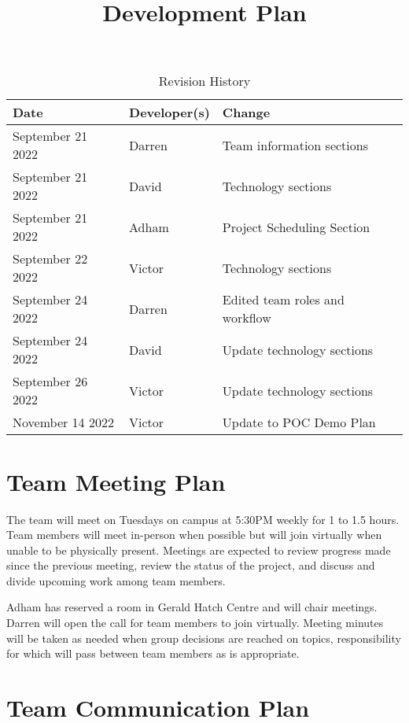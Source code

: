 \documentclass{article}
\title{Development Plan\\\progname}
\author{\authname}
\date{}
\begin{document}
\maketitle

\begin{table}[hp]
\caption{Revision History} \label{TblRevisionHistory}
\begin{tabularx}{\textwidth}{llX}
\toprule
\textbf{Date} & \textbf{Developer(s)} & \textbf{Change}\\
\midrule
September 21 2022 & Darren & Team information sections\\
September 21 2022 & David & Technology sections\\
September 21 2022 & Adham & Project Scheduling Section\\
September 22 2022 & Victor & Technology sections\\
September 24 2022 & Darren & Edited team roles and workflow\\
September 24 2022 & David & Update technology sections\\
September 26 2022 & Victor & Update technology sections\\
November 14 2022 & Victor & Update to POC Demo Plan\\
\bottomrule
\end{tabularx}
\end{table}



\section{Team Meeting Plan}

The team will meet on Tuesdays on campus at 5:30PM weekly for 1 to 1.5 hours. Team members will meet in-person when possible but will join virtually when unable to be physically present. Meetings are expected to review progress made since the previous meeting, review the status of the project, and discuss and divide upcoming work among team members.

Adham has reserved a room in Gerald Hatch Centre and will chair meetings. Darren will open the call for team members to join virtually. Meeting minutes will be taken as needed when group decisions are reached on topics, responsibility for which will pass between team members as is appropriate.

\section{Team Communication Plan}
\end{document}
